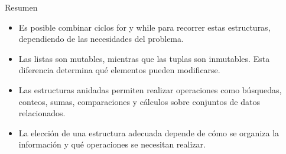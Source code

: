 \documentclass{beamer}
\begin{document}
    \begin{frame}[fragile, t]{Resumen}
        \begin{itemize}
            \item Es posible combinar ciclos for y while para recorrer estas estructuras, dependiendo de las necesidades del problema.
            \item Las listas son mutables, mientras que las tuplas son inmutables. 
            Esta diferencia determina qué elementos pueden modificarse.
            \item Las estructuras anidadas permiten realizar operaciones como búsquedas, conteos, sumas, comparaciones y 
            cálculos sobre conjuntos de datos relacionados.
            \item La elección de una estructura adecuada depende de cómo se organiza la información y qué operaciones se necesitan realizar.
        \end{itemize}
    \end{frame}
    
\end{document}
